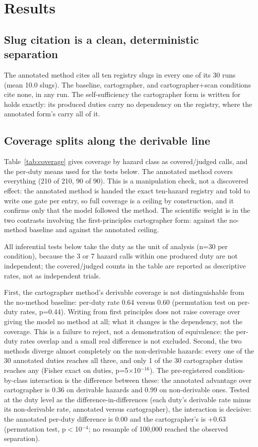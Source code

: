 \documentclass[11pt,a4paper]{article}
\begin{document}
\section{Results}\label{sec:results}

\subsection{Slug citation is a clean, deterministic separation}

The annotated method cites all ten registry slugs in every one of its 30 runs
(mean 10.0 slugs). The baseline, cartographer, and cartographer+scan conditions
cite none, in any run. The self-sufficiency the cartographer form is written for
holds exactly: its produced duties carry no dependency on the registry, where
the annotated form's carry all of it.

\subsection{Coverage splits along the derivable line}

Table~\ref{tab:coverage} gives coverage by hazard class as covered/judged calls,
and the per-duty means used for the tests below. The annotated method covers
everything (210 of 210, 90 of 90). This is a manipulation check, not a discovered
effect: the annotated method is handed the exact ten-hazard registry and told to
write one gate per entry, so full coverage is a ceiling by construction, and it
confirms only that the model followed the method. The scientific weight is in
the two contrasts involving the first-principles cartographer form: against the
no-method baseline and against the annotated ceiling.

All inferential tests below take the duty as the unit of analysis (n=30 per
condition), because the 3 or 7 hazard calls within one produced duty are not
independent; the covered/judged counts in the table are reported as descriptive
rates, not as independent trials.

First, the cartographer method's derivable coverage is not distinguishable from
the no-method baseline: per-duty rate 0.64 versus 0.60 (permutation test on
per-duty rates, p=0.44). Writing from first principles does not raise coverage
over giving the model no method at all; what it changes is the dependency, not
the coverage. This is a failure to reject, not a demonstration of equivalence:
the per-duty rates overlap and a small real difference is not excluded. Second,
the two methods diverge almost completely on the non-derivable hazards: every one
of the 30 annotated duties reaches all three, and only 1 of the 30 cartographer
duties reaches any (Fisher exact on duties, p=5$\times$10$^{-16}$). The
pre-registered condition-by-class interaction is the difference between these:
the annotated advantage over cartographer is 0.36 on derivable hazards and 0.99
on non-derivable ones. Tested at the duty level as the difference-in-differences
(each duty's derivable rate minus its non-derivable rate, annotated versus
cartographer), the interaction is decisive: the annotated per-duty difference is
0.00 and the cartographer's is +0.63 (permutation test, p$<$10$^{-4}$; no
resample of 100{,}000 reached the observed separation).
\end{document}
